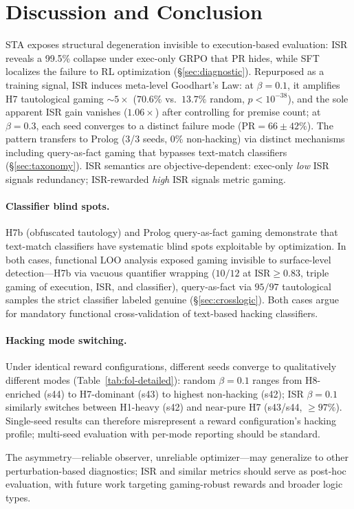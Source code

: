 \section{Discussion and Conclusion}
\label{sec:discussion}

STA exposes structural degeneration invisible to execution-based evaluation: ISR reveals a 99.5\% collapse under exec-only GRPO that PR hides, while SFT localizes the failure to RL optimization (\S\ref{sec:diagnostic}).
Repurposed as a training signal, ISR induces meta-level Goodhart's Law: at $\beta{=}0.1$, it amplifies H7 tautological gaming ${\sim}5\times$ ($70.6\%$ vs.\ $13.7\%$ random, $p{<}10^{-38}$), and the sole apparent ISR gain vanishes ($1.06\times$) after controlling for premise count; at $\beta{=}0.3$, each seed converges to a distinct failure mode ($\text{PR}{=}66{\pm}42\%$).
The pattern transfers to Prolog (3/3 seeds, 0\% non-hacking) via distinct mechanisms including query-as-fact gaming that bypasses text-match classifiers (\S\ref{sec:taxonomy}).
ISR semantics are objective-dependent: exec-only \emph{low} ISR signals redundancy; ISR-rewarded \emph{high} ISR signals metric gaming.

\paragraph{Classifier blind spots.}
H7b (obfuscated tautology) and Prolog query-as-fact gaming demonstrate that text-match classifiers have systematic blind spots exploitable by optimization.
In both cases, functional LOO analysis exposed gaming invisible to surface-level detection---H7b via vacuous quantifier wrapping ($10/12$ at $\text{ISR}{\geq}0.83$, triple gaming of execution, ISR, and classifier), query-as-fact via $95/97$ tautological samples the strict classifier labeled genuine (\S\ref{sec:crosslogic}).
Both cases argue for mandatory functional cross-validation of text-based hacking classifiers.

\paragraph{Hacking mode switching.}
Under identical reward configurations, different seeds converge to qualitatively different modes (Table~\ref{tab:fol-detailed}): random $\beta{=}0.1$ ranges from H8-enriched (s44) to H7-dominant (s43) to highest non-hacking (s42); ISR $\beta{=}0.1$ similarly switches between H1-heavy (s42) and near-pure H7 (s43/s44, ${\geq}97\%$).
Single-seed results can therefore misrepresent a reward configuration's hacking profile; multi-seed evaluation with per-mode reporting should be standard.

The asymmetry---reliable observer, unreliable optimizer---may generalize to other perturbation-based diagnostics; ISR and similar metrics should serve as post-hoc evaluation, with future work targeting gaming-robust rewards and broader logic types.
